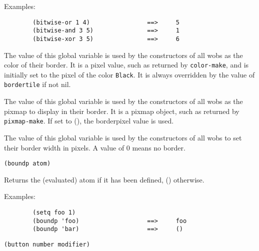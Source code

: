 {Examples:\exemplefont\upspace\begin{verbatim}
        (bitwise-or 1 4)                ==>     5
        (bitwise-and 3 5)               ==>     1
        (bitwise-xor 3 5)               ==>     6
\end{verbatim}}

        

The value of this global variable is used by the constructors of all wobs as
the color of their border. It is a pixel value, such as returned by
\verb"color-make", and is initially set to the pixel of the color
\verb"Black". It is always overridden by the value of \verb"bordertile" if
not nil.

        

The value of this global variable is used by the constructors of all wobs as
the pixmap to display in their border. It is a pixmap object, such as
returned by \verb"pixmap-make". If set to (), the borderpixel value is used.

        

The value of this global variable is used by the constructors of all wobs to
set their border width in pixels. A value of 0 means no border.

        
{\usagefont\begin{verbatim}
(boundp atom)
\end{verbatim}}\usageupspace

Returns the (evaluated) atom if it has been defined, () otherwise.

{Examples:\exemplefont\upspace\begin{verbatim}
        (setq foo 1)
        (boundp 'foo)                   ==>     foo
        (boundp 'bar)                   ==>     ()
\end{verbatim}}

        
{\usagefont\begin{verbatim}
(button number modifier)
\end{verbatim}}\usageupspace

